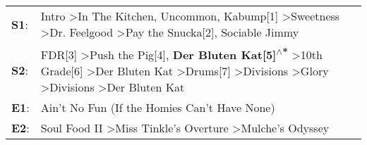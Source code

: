 \begin{supertabular}{p{0.03\textwidth}p{0.92\textwidth}}
 \textbf{S1}:  &                                                                                                                                                    Intro\textsuperscript{} \textgreater \enspace In The Kitchen\textsuperscript{}, \enspace Uncommon\textsuperscript{}, \enspace Kabump[1]\textsuperscript{} \textgreater \enspace Sweetness\textsuperscript{} \textgreater \enspace Dr. Feelgood\textsuperscript{} \textgreater \enspace Pay the Snucka[2]\textsuperscript{}, \enspace Sociable Jimmy\textsuperscript{}  \enspace  \\
 \textbf{S2}:  &  FDR[3]\textsuperscript{} \textgreater \enspace Push the Pig[4]\textsuperscript{}, \enspace \textbf{Der Bluten Kat[5]\textsuperscript{$\wedge$*}} \textgreater \enspace 10th Grade[6]\textsuperscript{} \textgreater \enspace Der Bluten Kat\textsuperscript{} \textgreater \enspace Drums[7]\textsuperscript{} \textgreater \enspace Divisions\textsuperscript{} \textgreater \enspace Glory\textsuperscript{} \textgreater \enspace Divisions\textsuperscript{} \textgreater \enspace Der Bluten Kat\textsuperscript{}  \enspace  \\
 \textbf{E1}:  &                                                                                                                                                                                                                                                                                                                                                                                                                                                           Ain't No Fun (If the Homies Can't Have None)\textsuperscript{}  \enspace  \\
 \textbf{E2}:  &                                                                                                                                                                                                                                                                                                                                                                   Soul Food II\textsuperscript{} \textgreater \enspace Miss Tinkle's Overture\textsuperscript{} \textgreater \enspace Mulche's Odyssey\textsuperscript{}  \enspace  \\
\end{supertabular}
